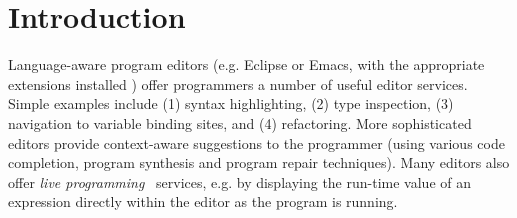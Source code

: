 \documentclass[letterpaper,USenglish]{lipics-v2016}
\newcommand{\Hazel}[0]{\textsf{Hazel}}
\newcommand{\HazelEnv}[0]{\Hazel}
\begin{document}
\begin{abstract}


\end{abstract}


\section{Introduction}



Language-aware program editors (e.g. Eclipse
or Emacs, with the appropriate  
extensions installed \cite{gamma2004contributing}) offer programmers a number of useful editor services. Simple examples include (1)
syntax highlighting, (2)
type inspection, (3)
navigation to variable binding sites, and (4)
refactoring. More sophisticated editors provide context-aware suggestions to the programmer (using various code completion, program synthesis and program repair techniques). Many editors also offer \emph{live programming}~\cite{McDirmid:2007:LUL:1297027.1297073,Burckhardt:2013:ACF:2491956.2462170} services, e.g. by displaying the run-time value of an expression directly within the editor as the program is running. 
\end{document}
